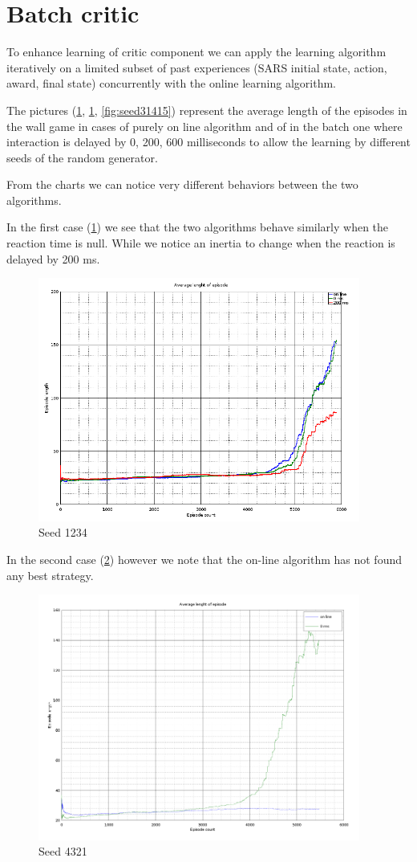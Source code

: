 \documentclass[a4paper,11pt]{article}
\begin{document}
\section{Batch critic}

To enhance learning of critic component we can apply
the learning algorithm iteratively on a limited subset
of past experiences (SARS initial state, action, award, final state)
concurrently with the online learning algorithm.

The pictures (\ref{fig:seed1234}, \ref{fig:seed1234}, \ref{fig:seed31415}) represent the average length of the episodes in
the wall game in cases of purely on line algorithm  and
of in the batch one where interaction is delayed by 0, 200, 600 milliseconds
to allow the learning by different seeds of the random generator.

From the charts we can notice very different behaviors between the two algorithms.

In the first case (\ref{fig:seed1234}) we see that the two algorithms behave similarly when the reaction time is null.
While we notice an inertia to change when the reaction is delayed by 200 ms.

\begin{figure}
	\label{fig:seed1234}
	\includegraphics[width=300pt]{episodes-123}
	\caption{Seed 1234}
\end{figure}

In the second case (\ref{fig:seed4321}) however we note that the on-line algorithm has not found any best strategy.

\begin{figure}
	\label{fig:seed4321}
	\includegraphics[width=300pt]{episodes-321}
	\caption{Seed 4321}
\end{figure}
\end{document}
